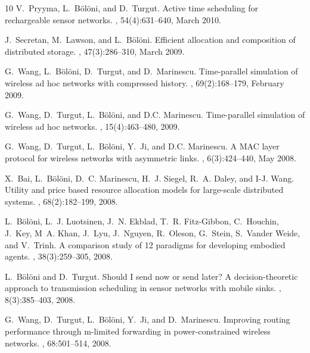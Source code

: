 \begin{thebibliography}{10}
V.~Pryyma, L.~Bölöni, and D.~Turgut.
\newblock Active time scheduling for rechargeable sensor networks.
, 54(4):631--640, March 2010.

J.~Secretan, M.~Lawson, and L.~Bölöni.
\newblock Efficient allocation and composition of distributed storage.
, 47(3):286--310, March 2009.

G.~Wang, L.~Bölöni, D.~Turgut, and D.~Marinescu.
\newblock Time-parallel simulation of wireless ad hoc networks with compressed
  history.
,
  69(2):168--179, February 2009.

G.~Wang, D.~Turgut, L.~Bölöni, and D.C. Marinescu.
\newblock Time-parallel simulation of wireless ad hoc networks.
,
  15(4):463--480, 2009.

G.~Wang, D.~Turgut, L.~Bölöni, Y.~Ji, and D.C. Marinescu.
\newblock A {MAC} layer protocol for wireless networks with asymmetric links.
, 6(3):424--440, May 2008.

X.~Bai, L.~Bölöni, D.~C. Marinescu, H.~J. Siegel, R.~A. Daley, and I-J. Wang.
\newblock Utility and price based resource allocation models for large-scale
  distributed systems.
, 68(2):182--199,
  2008.

L.~Bölöni, L.~J. Luotsinen, J.~N. Ekblad, T.~R. Fitz-Gibbon, C.~Houchin,
  J.~Key, M~A. Khan, J.~Lyu, J.~Nguyen, R.~Oleson, G.~Stein, S.~Vander Weide,
  and V.~Trinh.
\newblock A comparison study of 12 paradigms for developing embodied agents.
, 38(3):259--305, 2008.

L.~Bölöni and D.~Turgut.
\newblock Should {I} send now or send later? {A} decision-theoretic approach to
  transmission scheduling in sensor networks with mobile sinks.
,
  8(3):385--403, 2008.

G.~Wang, D.~Turgut, L.~Bölöni, Y.~Ji, and D.~Marinescu.
\newblock Improving routing performance through m-limited forwarding in
  power-constrained wireless networks.
,
  68:501--514, 2008.


\end{thebibliography}
